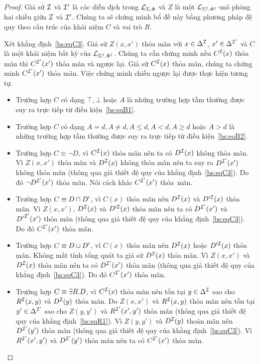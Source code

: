 \begin{proof}
	Giả sử $\mathcal{I}$ và $\mathcal{I}'$ là các diễn dịch trong $\mathcal{L}_{\Sigma,\Phi}$ và $Z$ là một $\mathcal{L}_{\Sigma^\dag,\Phi^\dag}$-mô phỏng hai chiều giữa $\mathcal{I}$ và $\mathcal{I}'$. Chúng ta sẽ chứng minh bổ đề này bằng phương pháp đệ quy theo cấu trúc của khái niệm $C$ và vai trò $R$.
	
	\semiItem Xét khẳng định~\eqref{bs:eqC3}. Giả sử $Z(x,x')$ thỏa mãn với $x \in \Delta^{\mathcal{I}}$, $x' \in \Delta^{\mathcal{I}'}$ và $C$ là một khái niệm bất kỳ của $\mathcal{L}_{\Sigma^\dag,\Phi^\dag}$. Chúng ta cần chứng minh nếu $C^{\mathcal{I}}(x)$ thỏa mãn thì $C^{\mathcal{I}'}(x')$ thỏa mãn và ngược lại.
	Giả sử $C^{\mathcal{I}}(x)$ thỏa mãn, chúng ta chứng minh $C^{\mathcal{I}'}(x')$ thỏa mãn. Việc chứng minh chiều ngược lại được thực hiện tương tự.
	
	\begin{itemize}
		\item Trường hợp $C$ có dạng $\top, \bot$ hoặc $A$ là những trường hợp tầm thường được suy ra trực tiếp từ điều kiện~\eqref{bs:eqB1}.
		
		\item Trường hợp $C$ có dạng $A = d, A\not=d, A \leq d, A < d, A \geq d$ hoặc $A > d$ là những trường hợp tầm thường được suy ra trực tiếp từ điều kiện~\eqref{bs:eqB2}.
		
		\item Trường hợp $C \equiv \neg D$, vì $C^{\mathcal{I}}(x)$ thỏa mãn nên ta có $D^{\mathcal{I}}(x)$ không thỏa mãn. Vì $Z(x,x')$ thỏa mãn và $D^{\mathcal{I}}(x)$ không thỏa mãn nên ta suy ra $D^{\mathcal{I}'}(x')$ không thỏa mãn (thông qua giả thiết đệ quy của khẳng định~\eqref{bs:eqC3}). Do đó $\neg D^{\mathcal{I}'}(x')$ thỏa mãn. Nói cách khác $C^{\mathcal{I}'}(x')$ thỏa~mãn.
		
		\item Trường hợp $C \equiv D \sqcap D'$, vì $C(x)$ thỏa mãn nên $D^{\mathcal{I}}(x)$ và $D'^{\mathcal{I}}(x)$ thỏa mãn. Vì $Z(x, x')$,  $D^{\mathcal{I}}(x)$ và $D'^{\mathcal{I}}(x)$ thỏa mãn nên ta có $D^{\mathcal{I}'}(x')$ và ${D'}^{\mathcal{I}'}(x')$ thỏa mãn (thông qua giả thiết đệ quy của khẳng định~\eqref{bs:eqC3}). Do đó $C^{\mathcal{I}'}(x')$ thỏa mãn.
		
		\item Trường hợp $C \equiv D \sqcup D'$, vì $C(x)$ thỏa mãn nên $D^{\mathcal{I}}(x)$ hoặc $D'^{\mathcal{I}}(x)$ thỏa mãn. Không mất tính tổng quát ta giả sử $D^{\mathcal{I}}(x)$ thỏa mãn. Vì $Z(x, x')$ và $D^{\mathcal{I}}(x)$ thỏa mãn nên ta có $D^{\mathcal{I}'}(x')$ thỏa mãn (thông qua giả thiết đệ quy của khẳng định~\eqref{bs:eqC3}). Do đó $C^{\mathcal{I}'}(x')$ thỏa mãn.
		
		\item Trường hợp $C \equiv \exists R.D$, vì $C^{\mathcal{I}}(x)$ thỏa mãn nên tồn tại $y \in \Delta^{\mathcal{I}}$ sao cho $R^{\mathcal{I}}(x, y)$ và $D^{\mathcal{I}}(y)$ thỏa mãn. Do $Z(x,x')$ và $R^{\mathcal{I}}(x, y)$ thỏa mãn nên tồn tại $y' \in \Delta^{\mathcal{I}'}$ sao cho $Z(y,y')$ và $R^{\mathcal{I}'}(x',y')$ thỏa mãn (thông qua giả thiết đệ quy của khẳng định~\eqref{bs:eqR1}). Vì $Z(y,y')$ và $D^{\mathcal{I}}(y)$ thoản mãn nên $D^{\mathcal{I}'}(y')$ thỏa mãn (thông qua giả thiết đệ quy của khẳng định~\eqref{bs:eqC3}). Vì $R^{\mathcal{I}'}(x',y')$ và $D^{\mathcal{I}'}(y')$ thỏa mãn nên ta có $C^{\mathcal{I}'}(x')$ thỏa mãn.
		

\end{itemize}
\end{proof}
